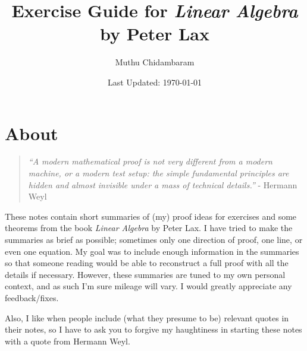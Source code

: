 \documentclass{article}
\begin{document}
\title{Exercise Guide for \textit{Linear Algebra} by Peter Lax}
\author{Muthu Chidambaram}
\date{Last Updated: \today}

\maketitle

\tableofcontents
\newpage 

\section*{About}

\begin{quote}
        \textit{``A modern mathematical proof is not very different from a modern machine,
or a modern test setup: the simple fundamental principles are hidden 
and almost invisible under a mass of technical details.''} - Hermann Weyl
\end{quote}

These notes contain short summaries of (my) proof ideas for exercises
and some theorems from the book \textit{Linear Algebra} by Peter Lax.
I have tried to make the summaries as brief as possible; sometimes only one direction of proof, 
one line, or even one equation. My goal was to include enough information in the summaries so that
someone reading would be able to reconstruct a full proof with all the details if necessary.
However, these summaries are tuned to my own personal context, and as such I'm sure mileage will vary.
I would greatly appreciate any feedback/fixes.

Also, I like when people include (what they presume to be) relevant quotes in their notes, so I have to ask you to forgive my haughtiness in starting these notes with a quote from Hermann Weyl.






\end{document}

